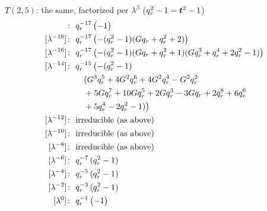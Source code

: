$T(2,5)$: the same, factorized per $\lambda^\beta$ ($q_r^2 - 1 = \bm{t}^2 - 1$)
\begin{align*}
[\lambda^{-20}]\colon\ & \qr^{-17}\,\bigl(-1\bigr) \\
[\lambda^{-18}]\colon\ & \qr^{-17}\,\bigl(- (\qr^2 - 1)(G \qr + \qr^{2} + 2)\bigr) \\
[\lambda^{-16}]\colon\ & \qr^{-17}\,\bigl(- (\qr^2 - 1)(G \qr + \qr^{2} + 1)(G \qr^{3} + \qr^{4} + 2 \qr^{2} - 1)\bigr) \\
[\lambda^{-14}]\colon\ & \qr^{-15}\,\bigl(- (\qr^2 - 1) \\
& \quad (G^{3} \qr^{5} + 4 G^{2} \qr^{6} + 4 G^{2} \qr^{4} - G^{2} \qr^{2} \\
& \quad  + 5 G \qr^{7} + 10 G \qr^{5} + 2 G \qr^{3} - 3 G \qr + 2 \qr^{8} + 6 \qr^{6} \\
& \quad  + 5 \qr^{4} - 2 \qr^{2} - 1)\bigr) \\
[\lambda^{-12}]\colon\ & \text{irreducible (as above)} \\
[\lambda^{-10}]\colon\ & \text{irreducible (as above)} \\
[\lambda^{-8}]\colon\ & \text{irreducible (as above)} \\
[\lambda^{-6}]\colon\ & \qr^{-7}\,(\qr^2 - 1) \\
[\lambda^{-4}]\colon\ & \qr^{-5}\,(\qr^2 - 1) \\
[\lambda^{-2}]\colon\ & \qr^{-3}\,(\qr^2 - 1) \\
[\lambda^{0}]\colon\ & \qr^{-1}\,\bigl(-1\bigr)
\end{align*}
